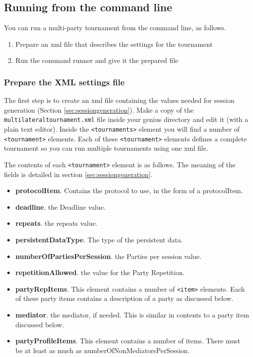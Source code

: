 \documentclass[]{article}
\begin{document}
\subsection{Running from the command line}
You can run a multi-party tournament from the command line, as follows.

\begin{enumerate}
\item Prepare an xml file that describes the settings for the tournament
\item Run the command runner and give it the prepared file 
\end{enumerate}

\subsubsection{Prepare the XML settings file}
The first step is to create an xml file containing the values needed for session generation (Section \ref{sec:sessiongeneration}).
Make a copy of the \verb|multilateraltournament.xml| file inside your genius directory and edit it (with a plain text editor).  Inside the \verb|<tournaments>| element you will find a number of \verb|<tournament>| elements. Each of these \verb|<tournament>| elements defines a complete tournament so you can run multiple tournaments using one xml file.

The contents of each \verb|<tournament>| element is as follows. The meaning of the fields is detailed in section \ref{sec:sessiongeneration}.

\begin{itemize}
\item \textbf{protocolItem}. Contains the protocol to use, in the form of a protocolItem.
\item \textbf{deadline}.  the Deadline value.
\item \textbf{repeats}. the repeats value. 
\item \textbf{persistentDataType}. The type of the persistent data.
\item \textbf{numberOfPartiesPerSession}. the Parties per session value.
\item  \textbf{repetitionAllowed}. the value for the Party Repetition. 
\item \textbf{partyRepItems}. This element contains a number of \verb|<item>| elements. Each of these party items contains a description of a party as discussed below.
\item \textbf{mediator}. the mediator, if needed. This is similar in contents to a party item discussed below. 
 \item \textbf{partyProfileItems}. This element contains a number of items. There must be at least as much as numberOfNonMediatorsPerSession. 
 \end{itemize}
\end{document}
